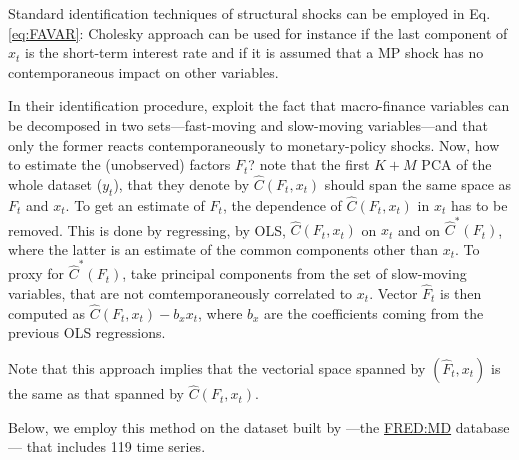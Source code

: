 \documentclass[
  12pt,
]{book}
\theoremstyle{definition}
\theoremstyle{definition}
\theoremstyle{definition}
\theoremstyle{definition}
\theoremstyle{remark}
\begin{document}
Standard identification techniques of structural shocks can be employed in Eq. \eqref{eq:FAVAR}: Cholesky approach can be used for instance if the last component of \(x_t\) is the short-term interest rate and if it is assumed that a MP shock has no contemporaneous impact on other variables.

In their identification procedure, \citet{Bernanke_Boivin_Eliasz_2005} exploit the fact that macro-finance variables can be decomposed in two sets---fast-moving and slow-moving variables---and that only the former reacts contemporaneously to monetary-policy shocks. Now, how to estimate the (unobserved) factors \(F_t\)? \citet{Bernanke_Boivin_Eliasz_2005} note that the first \(K+M\) PCA of the whole dataset (\(y_t\)), that they denote by \(\hat{C}(F_t,x_t)\) should span the same space as \(F_t\) and \(x_t\). To get an estimate of \(F_t\), the dependence of \(\hat{C}(F_t,x_t)\) in \(x_t\) has to be removed. This is done by regressing, by OLS, \(\hat{C}(F_t,x_t)\) on \(x_t\) and on \(\hat{C}^*(F_t)\), where the latter is an estimate of the common components other than \(x_t\). To proxy for \(\hat{C}^*(F_t)\), \citet{Bernanke_Boivin_Eliasz_2005} take principal components from the set of slow-moving variables, that are not comtemporaneously correlated to \(x_t\). Vector \(\hat{F}_t\) is then computed as \(\hat{C}(F_t,x_t) - b_x x_t\), where \(b_x\) are the coefficients coming from the previous OLS regressions.

Note that this approach implies that the vectorial space spanned by \((\hat{F}_t,x_t)\) is the same as that spanned by \(\hat{C}(F_t,x_t)\).

Below, we employ this method on the dataset built by \citet{McCracken_Ng_2016} ---the \href{https://research.stlouisfed.org/wp/more/2015-012}{FRED:MD} database--- that includes 119 time series.
\end{document}
